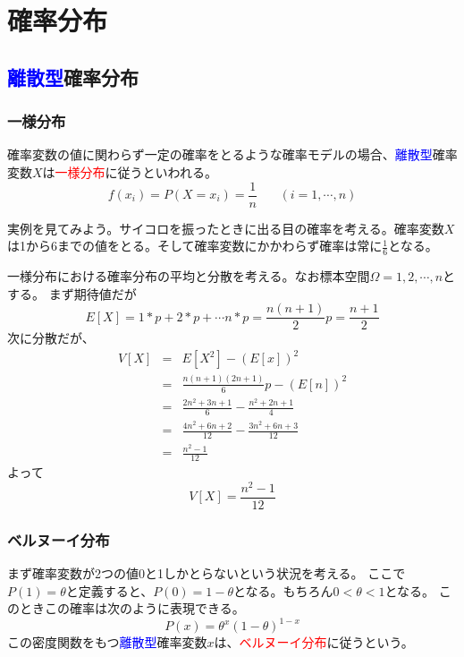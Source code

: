 \documentclass[a4paper,10pt]{jarticle}
\begin{document}
\section{確率分布}
\subsection{\textcolor{blue}{離散型}確率分布}
\subsubsection{一様分布}
確率変数の値に関わらず一定の確率をとるような確率モデルの場合、\textcolor{blue}{離散型}確率変数$X$は\textcolor{red}{一様分布}に従うといわれる。
\begin{equation}
    f(x_i) = P(X=x_i) = \frac{1}{n}\ \ \ \ \ \ \ \ (i=1,\cdots ,n)\tag{3,1}
\end{equation}

実例を見てみよう。サイコロを振ったときに出る目の確率を考える。確率変数$X$は1から6までの値をとる。そして確率変数にかかわらず確率は常に$\frac{1}{6}$となる。

一様分布における確率分布の平均と分散を考える。なお標本空間$\Omega={1,2,\cdots,n}$とする。
まず期待値だが
\begin{equation}
    E[X] = 1*p+2*p+\cdots n*p = \frac{n(n+1)}{2}p = \frac{n+1}{2}\tag{3,2}
\end{equation}
次に分散だが、
\begin{eqnarray*}
    V[X] &=& E[X^2]-(E[x])^2\\
    &=& \frac{n(n+1)(2n+1)}{6}p-(E[n])^2\\
    &=& \frac{2n^2+3n+1}{6}-\frac{n^2+2n+1}{4}\\
    &=& \frac{4n^2+6n+2}{12}-\frac{3n^2+6n+3}{12}\\
    &=&\frac{n^2-1}{12}
\end{eqnarray*}
よって
\begin{equation}
    V[X] = \frac{n^2-1}{12}\tag{3,3}
\end{equation}

\subsubsection{ベルヌーイ分布}
まず確率変数が2つの値0と1しかとらないという状況を考える。
ここで$P(1)=\theta$と定義すると、$P(0)=1-\theta$となる。もちろん$0<\theta < 1$となる。
このときこの確率は次のように表現できる。
\begin{equation}
    P(x) = \theta^x (1-\theta)^{1-x}\tag{3,4}
\end{equation}
この密度関数をもつ\textcolor{blue}{離散型}確率変数$x$は、\textcolor{red}{ベルヌーイ分布}に従うという。
\end{document}

